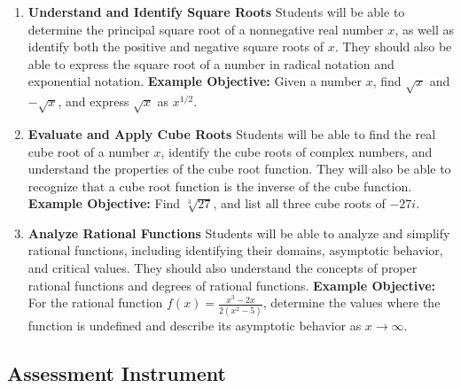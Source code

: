 \begin{enumerate}
    \item \textbf{Understand and Identify Square Roots} Students will be able to determine the principal square root of a nonnegative real number $x$, as well as identify both the positive and negative square roots of $x$. They should also be able to express the square root of a number in radical notation and exponential notation. \textbf{Example Objective:} Given a number $x$, find $\sqrt{x}$ and $-\sqrt{x}$, and express $\sqrt{x}$ as $x^{1/2}$.
    \item \textbf{Evaluate and Apply Cube Roots} Students will be able to find the real cube root of a number $x$, identify the cube roots of complex numbers, and understand the properties of the cube root function. They will also be able to recognize that a cube root function is the inverse of the cube function. \textbf{Example Objective:} Find $\sqrt[3]{27}$, and list all three cube roots of $-27i$.
    \item \textbf{Analyze Rational Functions} Students will be able to analyze and simplify rational functions, including identifying their domains, asymptotic behavior, and critical values. They should also understand the concepts of proper rational functions and degrees of rational functions. \textbf{Example Objective:} For the rational function $f(x) = \frac{x^{3} - 2x}{2(x^{2} - 5)}$, determine the values where the function is undefined and describe its asymptotic behavior as $x \to \infty$.
\end{enumerate}

\subsection{Assessment Instrument}

